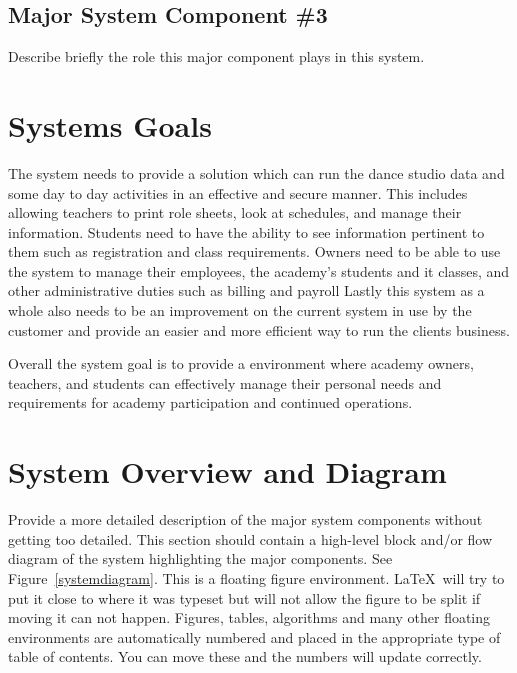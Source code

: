 \subsection{Major System Component \#3}
Describe briefly the role this major component plays in this system. 

\section{Systems Goals}
The system needs to provide a solution which can run the dance studio data and some day to day activities in an effective and secure manner. This includes allowing teachers to print role sheets, look at schedules, and manage their information. Students need to have the ability to see information pertinent to them such as registration and class requirements. Owners need to be able to use the system to manage their employees, the academy's students and it classes, and other administrative duties such as billing and payroll  Lastly this system as a whole also needs to be an improvement on the current system in use by the customer and provide an easier and more efficient way to run the clients business.

Overall the system goal is to provide a environment where academy owners, teachers, and students can effectively manage their personal needs and requirements for academy participation and continued operations.


\section{System Overview and Diagram}
Provide a more detailed description of the major system components
without getting too detailed.  This section should contain a
high-level block and/or flow diagram of the system highlighting the
major components.  See Figure~\ref{systemdiagram}.  This is a floating
figure environment.  \LaTeX\ will try to put it close to where it was
typeset but will not allow the figure to be split if moving it can not
happen.  Figures, tables, algorithms and many other floating
environments are automatically numbered and placed in the appropriate
type of table of contents.  You can move these and the numbers will
update correctly.

